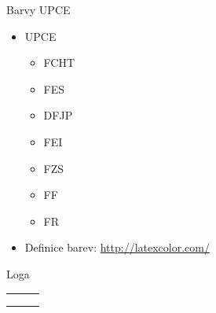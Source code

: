 \documentclass{beamer}							%
\begin{document}
\begin{frame}[fragile, shrink=0]{Barvy UPCE}
	\begin{itemize}
		\item \textcolor{upce}{UPCE}
		\begin{itemize}
			\item \textcolor{fcht}{FCHT}
			\item \textcolor{fes}{FES}
			\item \textcolor{dfjp}{DFJP}
			\item \textcolor{fei}{FEI}
			\item \textcolor{fzs}{FZS}
			\item \textcolor{ff}{FF}
			\item \textcolor{fr}{FR}
		\end{itemize}

		\item Definice barev: \url{http://latexcolor.com/}
	\end{itemize}
\end{frame}
\begin{frame}{Loga}
\begin{center}
\begin{tabular}{lll}
	 \logofes	& 	\logofei[width=3cm] 	& \logodfjp \\
	
	\logofcht 	&	\logoupce[width=5cm] 	&  \logofzs \\
	
	\logoff 	&	\logofr \\
\end{tabular}
\end{center}

\end{frame}
\end{document}
